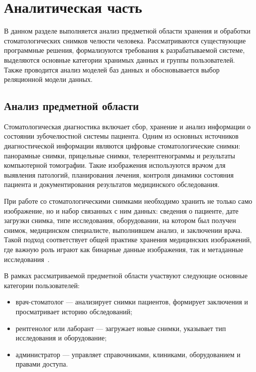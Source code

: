 \chapter{Аналитическая часть}

В данном разделе выполняется анализ предметной области хранения и обработки стоматологических снимков челюсти человека. Рассматриваются существующие программные решения, формализуются требования к разрабатываемой системе, выделяются основные категории хранимых данных и группы пользователей. Также проводится анализ моделей баз данных и обосновывается выбор реляционной модели данных.

\section{Анализ предметной области}

Стоматологическая диагностика включает сбор, хранение и анализ информации о состоянии зубочелюстной системы пациента. Одним из основных источников диагностической информации являются цифровые стоматологические снимки: панорамные снимки, прицельные снимки, телерентгенограммы и результаты компьютерной томографии. Такие изображения используются врачом для выявления патологий, планирования лечения, контроля динамики состояния пациента и документирования результатов медицинского обследования.

При работе со стоматологическими снимками необходимо хранить не только само изображение, но и набор связанных с ним данных: сведения о пациенте, дате загрузки снимка, типе исследования, оборудовании, на котором был получен снимок, медицинском специалисте, выполнившем анализ, и заключении врача. Такой подход соответствует общей практике хранения медицинских изображений, где важную роль играют как бинарные данные изображения, так и метаданные исследования~\cite{dicom-standard}.

В рамках рассматриваемой предметной области участвуют следующие основные категории пользователей:
\begin{itemize}
	\item врач-стоматолог --- анализирует снимки пациентов, формирует заключения и просматривает историю обследований;
	\item рентгенолог или лаборант --- загружает новые снимки, указывает тип исследования и оборудование;
	\item администратор --- управляет справочниками, клиниками, оборудованием и правами доступа.
\end{itemize}

